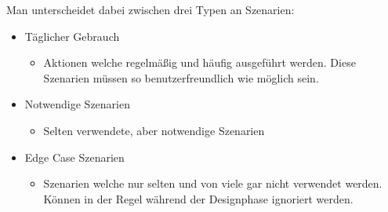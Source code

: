 \documentclass{article}
\begin{document}
	Man unterscheidet dabei zwischen drei Typen an Szenarien:
	\begin{itemize}
		\item{Täglicher Gebrauch}
		\begin{itemize}
			\item{Aktionen welche regelmäßig und häufig ausgeführt werden. Diese Szenarien müssen so benutzerfreundlich wie möglich sein.}
		\end{itemize}
		\item{Notwendige Szenarien}
		\begin{itemize}
			\item{Selten verwendete, aber notwendige Szenarien}
		\end{itemize}
		\item{Edge Case Szenarien}
		\begin{itemize}
			\item{Szenarien welche nur selten und von viele gar nicht verwendet werden. Können in der Regel während der Designphase ignoriert werden.}
		\end{itemize}
	\end{itemize}
\end{document}
